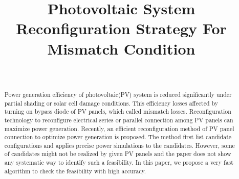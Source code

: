 \documentclass[conference]{IEEEtran}
\begin{document}
\title{Photovoltaic System Reconfiguration Strategy For Mismatch Condition\\
  {\footnotesize \textsuperscript{}}}

\author{
  }

 \author{
 \\
 \and
 }

\maketitle
\begin{abstract}
  Power generation efficiency of photovoltaic(PV) system is reduced significantly under partial shading or solar cell damage  conditions. This efficiency losses affected by turning on bypass diode of PV panels, which called mismatch losses. Reconfiguration technology to reconfigure electrical series or parallel connection among PV panels can maximize power generation. Recently, an efficient reconfiguration method of PV panel connection to optimize power generation is proposed. The method first list candidate configurations and applies precise power simulations to the candidates. However, some of candidates might not be realized by given PV panels and the paper does not show any systematic way to identify such a feasibility. In this paper, we propose a very fast algorithm to check the feasibility with high accuracy.
\end{abstract}
\end{document}
